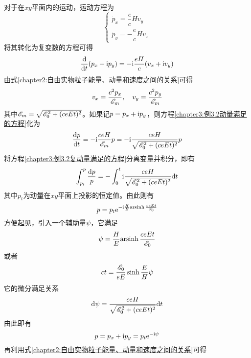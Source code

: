 \begin{solution}
对于在$xy$平面内的运动，运动方程为
\begin{equation*}
\begin{cases}
	\dot{p}_x = \dfrac{e}{c}Hv_y \\[1.5ex]
	\dot{p}_y = -\dfrac{e}{c}Hv_x
\end{cases}
\end{equation*}
将其转化为复变数的方程可得
\begin{equation}
	\frac{\mathrm{d}}{\mathrm{d} t}(p_x+\mathrm{i} p_y) = -\mathrm{i} \dfrac{eH}{c}(v_x+\mathrm{i} v_y)
	\label{chapter3:例3.2动量满足的方程}
\end{equation}
由式\eqref{chapter2:自由实物粒子能量、动量和速度之间的关系}可得
\begin{equation*}
	v_x = \frac{c^2p_x}{\mathscr{E}_m},\quad v_y = \frac{c^2p_y}{\mathscr{E}_m}
\end{equation*}
其中$\mathscr{E}_m = \sqrt{\mathscr{E}_0^2+(ceEt)^2}$。如果记$p=p_x+\mathrm{i} p_y$，则方程\eqref{chapter3:例3.2动量满足的方程}化为
\begin{equation}
	\frac{\mathrm{d} p}{\mathrm{d} t} = -\mathrm{i} \frac{ceH}{\mathscr{E}_m}p = -\mathrm{i} \frac{ceH}{\sqrt{\mathscr{E}_0^2+(ceEt)^2}}p
	\label{chapter3:例3.2复动量满足的方程}
\end{equation}
将方程\eqref{chapter3:例3.2复动量满足的方程}分离变量并积分，即有
\begin{equation*}
	\int_{p_t}^p \frac{\mathrm{d} p}{p} = -\int_0^t \mathrm{i} \frac{ceH}{\sqrt{\mathscr{E}_0^2+(ceEt)^2}} \mathrm{d} t
\end{equation*}
其中$p_t$为动量在$xy$平面上投影的恒定值。由此则有
\begin{equation*}
	p = p_t\mathrm{e}^{-\mathrm{i} \frac{H}{E}\mathrm{arsinh}\, \frac{ceEt}{\mathscr{E}_0}}
\end{equation*}
方便起见，引入一个辅助量$\psi$，它满足
\begin{equation*}
	\psi = \frac{H}{E}\mathrm{arsinh}\, \frac{ceEt}{\mathscr{E}_0}
\end{equation*}
或者
\begin{equation}
	ct = \frac{\mathscr{E}_0}{eE}\sinh \frac{E}{H}\psi
	\label{chapter3:例3.2辅助量psi与时间的关系}
\end{equation}
它的微分满足关系
\begin{equation*}
	\mathrm{d} \psi = \frac{ceH}{\sqrt{\mathscr{E}_0^2+(ceEt)^2}} \mathrm{d} t
\end{equation*}
由此即有
\begin{equation*}
	p = p_x+\mathrm{i} p_y = p_t\mathrm{e}^{-\mathrm{i} \psi}
\end{equation*}
再利用式\eqref{chapter2:自由实物粒子能量、动量和速度之间的关系}可得
\begin{equation*}

\end{equation*}
\end{solution}
